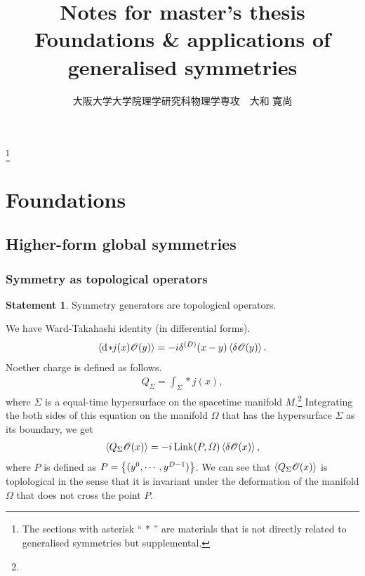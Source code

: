 \documentclass[dvipdfmx]{article}
\title{{\large {\bf Notes for master's thesis}}\\{\bf Foundations \& applications of generalised symmetries}}
\author{大阪大学大学院理学研究科物理学専攻　大和 寛尚}
\date{}
\theoremstyle{definition}
\newtheorem{statement}{Statement}[section]
\numberwithin{equation}{section}
\newcommand{\link}{\mathrm{Link}}
\newcommand{\hodge}{\hspace{-0.5mm}*\hspace{-1mm}}
\newenvironment{stmt}{
  \begin{tcolorbox}[colframe=white, arc=0mm, colback=gray!25]
    \begin{statement}
    }{
    \end{statement}
  \end{tcolorbox}
}
\begin{document}
\maketitle

\tableofcontents
\footnote{The sections with asterisk `` * '' are materials that is not directly related to generalised symmetries but supplemental.}

\section{Foundations}
\subsection{Higher-form global symmetries}
\subsubsection{Symmetry as topological operators}
\begin{stmt}
  Symmetry generators are topological operators.
\end{stmt}
We have Ward-Takahashi identity (in differential forms).
\begin{align}
  \ev{\dd \hodge j(x) \mathscr{O}(y)} = -i\delta^{(D)}(x - y)\ev{\delta \mathscr{O}(y)}.
\end{align}
Noether charge is defined as follows.
\begin{align}
  Q_\Sigma = \int_\Sigma *j(x),
\end{align}
where $\Sigma$ is a equal-time hypersurface on the spacetime manifold $M$.\footnote{}
Integrating the both sides of this equation on the manifold $\varOmega$ that has the hypersurface $\Sigma$ as its boundary, we get
\begin{align}
  \ev{Q_\Sigma \mathscr{O}(x)} = -i \, \link(P, \varOmega) \ev{\delta \mathscr{O}(x)}, \label{WT}
\end{align}
where $P$ is defined as $P = \qty{(y^0, \cdots, y^{D-1})}$. We can see that $\ev{Q_\Sigma \mathscr{O}(x)}$ is toplological in the sense that it is invariant under the deformation of the manifold $\varOmega$ that does not cross the point $P$.
\end{document}
